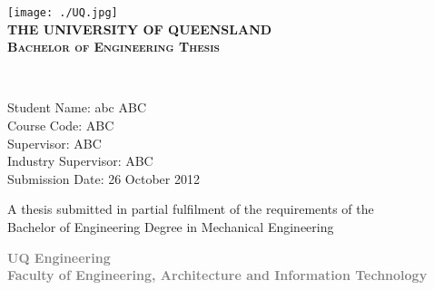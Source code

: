 \begin{titlepage}

\begin{center}

\texttt{[image: ./UQ.jpg]}\\[1.5cm]    

\textsc{\Large \bfseries {\Huge T}HE {\Huge U}NIVERSITY OF {\Huge Q}UEENSLAND}\\[2cm]

\textsc{\large \bfseries Bachelor of Engineering Thesis}\\[1.5cm]


\newlength{\mylength}

\setlength{\fboxsep}{1pt}
\setlength{\mylength}{\linewidth}

\addtolength{\mylength}{-1.5\fboxsep}
\addtolength{\mylength}{-1.5\fboxrule}


		
\textsc{}\\[1.5cm]

\begin{minipage}{0.8\textwidth}
\begin{flushleft} \large
Student Name: abc \textsc{ABC}\\[0.1cm]
Course Code: ABC\\[0.1cm]
Supervisor: ABC\\[0.1cm]
Industry Supervisor: ABC\\[0.1cm]
Submission Date: 26 October 2012\\[0.1cm]
\end{flushleft}
\end{minipage}




\vfill


{\small A thesis submitted in partial fulfilment of the requirements of the\\
Bachelor of Engineering Degree in Mechanical Engineering\\[1.5cm]}

\textcolor{Gray}
{
{\small  \bfseries UQ Engineering\\[0.5cm]
Faculty of Engineering, Architecture and Information Technology}
}


\end{center}

\end{titlepage}